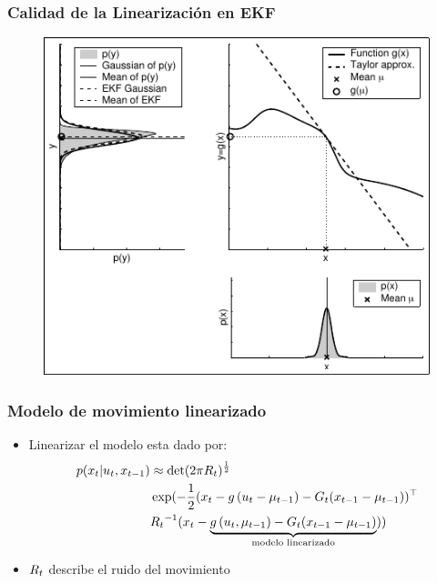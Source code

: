 \begin{frame}
    \frametitle{Calidad de la Linearización en EKF}
    
    \begin{figure}[!h]
        \includegraphics[width=0.5\columnwidth]{./images/dependency_approximation_quality_narrow.pdf}
    \end{figure}
\end{frame}


\begin{frame}
    \frametitle{Modelo de movimiento linearizado}
    
    \begin{itemize}
        \item Linearizar el modelo esta dado por:
    \begin{align*}
        p(x_{t} | u_{t}, x_{t-1}) &\approx \det(2 \pi R_{t})^{\frac{1}{2}}\\
        &\exp (-\dfrac{1}{2} (x_{t} - g\left( u_{t}-\mu_{t-1} \right) - G_{t}(x_{t-1}-\mu_{t-1}))^{\top}\\
        &{R_{t}}^{-1} (x_{t} - \underbrace{g\left( u_{t},\mu_{t-1} \right) - G_{t} (x_{t-1}-\mu_{t-1})}_{\text{modelo linearizado}}))
    \end{align*}
    
    \item $R_{t}$ describe el ruido del movimiento
    \end{itemize}    
\end{frame}

